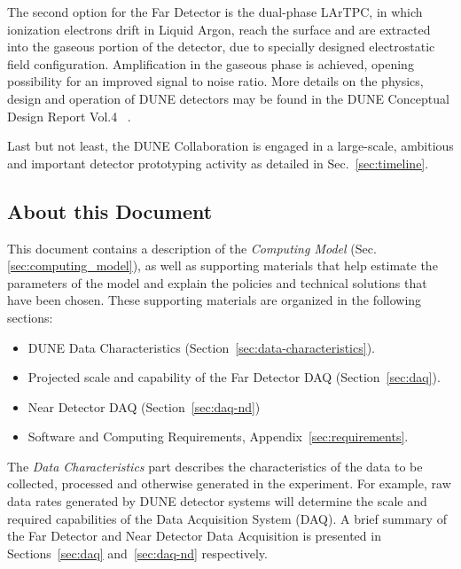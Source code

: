 The second option for the Far Detector is the dual-phase LArTPC, in which ionization electrons 
drift  in Liquid Argon, reach the surface and are extracted into the gaseous portion of the detector,
due to specially designed electrostatic field configuration. Amplification in the gaseous phase
is achieved, opening possibility for an improved signal to noise ratio.
More details on the physics, design and operation of DUNE detectors 
may be found in the DUNE Conceptual Design Report Vol.4 ~\cite{cdr_vol4_docdb}.

Last but not least, the DUNE Collaboration is engaged in a large-scale, ambitious and important detector prototyping
activity as detailed in Sec.~\ref{sec:timeline}.


\subsection{About this Document}
\label{sec:modelrole}

This document contains a description of the \textit{Computing Model} (Sec.\ref{sec:computing_model}),
as well as supporting materials that help estimate the parameters of the model and
explain the policies and technical solutions that have been chosen.  These supporting materials are
organized in the following sections:

\begin{itemize}
\item DUNE Data Characteristics (Section~\ref{sec:data-characteristics}).
\item Projected scale and capability of the Far Detector DAQ (Section~\ref{sec:daq}).
\item Near Detector DAQ (Section~\ref{sec:daq-nd})
\item Software and Computing Requirements, Appendix~\ref{sec:requirements}.
\end{itemize}

\noindent
The \textit{Data Characteristics} part describes the characteristics of the data to be collected, processed and otherwise generated in the experiment.
For example, raw data rates generated by DUNE detector systems will determine the scale and required capabilities of the Data
Acquisition System (DAQ).  A brief summary of the Far Detector and Near Detector Data Acquisition is presented in Sections~\ref{sec:daq}
and~\ref{sec:daq-nd} respectively.

